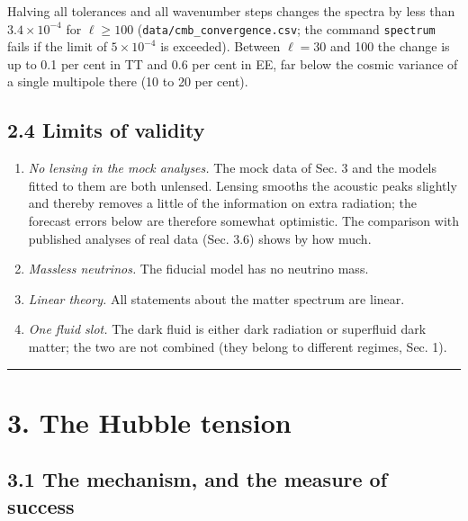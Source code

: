 \documentclass[
  10pt,
]{article}
\providecommand{\tightlist}{%
  \setlength{\itemsep}{0pt}\setlength{\parskip}{0pt}}
\begin{document}
Halving all tolerances and all wavenumber steps changes the spectra by
less than \(3.4\times10^{-4}\) for \(\ell\ge100\)
(\texttt{data/cmb\_convergence.csv}; the command \texttt{spectrum} fails
if the limit of \(5\times10^{-4}\) is exceeded). Between \(\ell=30\) and
100 the change is up to 0.1 per cent in TT and 0.6 per cent in EE, far
below the cosmic variance of a single multipole there (10 to 20 per
cent).

\hypertarget{limits-of-validity}{%
\subsection{2.4 Limits of validity}\label{limits-of-validity}}

\begin{enumerate}
\def\labelenumi{\arabic{enumi}.}
\tightlist
\item
  \emph{No lensing in the mock analyses.} The mock data of Sec. 3 and
  the models fitted to them are both unlensed. Lensing smooths the
  acoustic peaks slightly and thereby removes a little of the
  information on extra radiation; the forecast errors below are
  therefore somewhat optimistic. The comparison with published analyses
  of real data (Sec. 3.6) shows by how much.
\item
  \emph{Massless neutrinos.} The fiducial model has no neutrino mass.
\item
  \emph{Linear theory.} All statements about the matter spectrum are
  linear.
\item
  \emph{One fluid slot.} The dark fluid is either dark radiation or
  superfluid dark matter; the two are not combined (they belong to
  different regimes, Sec. 1).
\end{enumerate}

\begin{center}\rule{0.5\linewidth}{0.5pt}\end{center}

\hypertarget{the-hubble-tension}{%
\section{3. The Hubble tension}\label{the-hubble-tension}}

\hypertarget{the-mechanism-and-the-measure-of-success}{%
\subsection{3.1 The mechanism, and the measure of
success}\label{the-mechanism-and-the-measure-of-success}}
\end{document}
